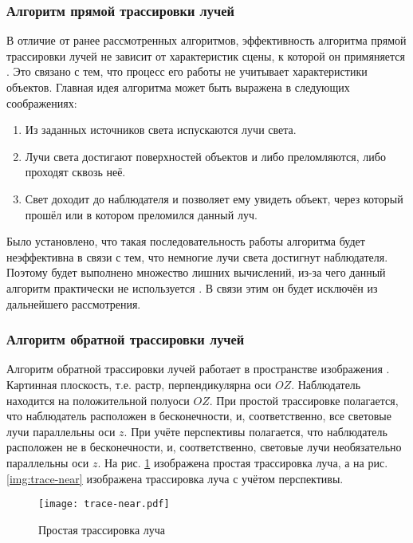 \subsubsection{Алгоритм прямой трассировки лучей}
В отличие от ранее рассмотренных алгоритмов, эффективность алгоритма прямой трассировки лучей не зависит от характеристик сцены, к которой он примяняется \cite{item12}. Это связано с тем, что процесс его работы не учитывает характеристики объектов. Главная идея алгоритма может быть выражена в следующих соображениях:
\begin{enumerate}[label={\arabic*)}]
	\item Из заданных источников света испускаются лучи света.
	\item Лучи света достигают поверхностей объектов и либо преломляются, либо проходят сквозь неё.
	\item Свет доходит до наблюдателя и позволяет ему увидеть объект, через который прошёл или в котором преломился данный луч.
\end{enumerate}

Было установлено, что такая последовательность работы алгоритма будет неэффективна в связи с тем, что немногие лучи света достигнут наблюдателя. Поэтому будет выполнено множество лишних вычислений, из-за чего данный алгоритм практически не используется \cite{item12}. В связи этим он будет исключён из дальнейшего рассмотрения. 

\subsubsection{Алгоритм обратной трассировки лучей}
Алгоритм обратной трассировки лучей работает в пространстве изображения \cite{item12}. Картинная плоскость, т.е. растр, перпендикулярна оси $OZ$. Наблюдатель находится на положительной полуоси $OZ$. При простой трассировке полагается, что наблюдатель расположен в бесконечности, и, соответственно, все световые лучи параллельны оси $z$. При учёте перспективы полагается, что наблюдатель расположен не в бесконечности, и, соответственно, световые лучи необязательно параллельны оси $z$. На рис. \ref{img:trace-inf} изображена простая трассировка луча, а на рис. \ref{img:trace-near} изображена трассировка луча с учётом перспективы.

\begin{figure}[h!]
    \centering
    \texttt{[image: trace-near.pdf]}
    \caption{Простая трассировка луча}
    \label{img:trace-inf}
\end{figure}

